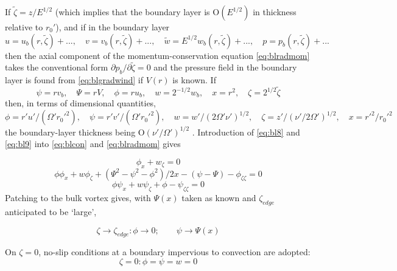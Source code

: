 \documentclass[preprint, prX]{revtex4}
\newcommand{\vpd}[2]{\partial#1 / \partial#2}
\begin{document}
If $\tilde{\zeta} = z/E^{1/2}$ (which implies that the boundary layer is O$(E^{1/2} )$ in thickness relative
to $r_0'$), and if in the boundary layer
\begin{equation}
u = u_b(r,\tilde{\zeta})+..., \quad 
v = v_b(r,\tilde{\zeta})+..., \quad 
\tilde{w} = E^{1/2}w_b(r,\tilde{\zeta})+..., \quad 
p = p_b(r,\tilde{\zeta})+... 
\label{eq:bl8}
\end{equation}
then the axial component of the momentum-conservation equation \eqref{eq:blradmom} takes the conventional form $\vpd{p_b}{\tilde{\zeta}}=0$ and the pressure field in the boundary layer is found from \eqref{eq:blgradwind} if $V(r)$ is known. If
\begin{equation}
\psi = r v_b, \quad
\Psi = rV, \quad
\phi = r u_b, \quad
w=2^{-1/2} w_b, \quad
x=r^2, \quad
\zeta = 2^{1/2} \tilde{\zeta}
\label{eq:bl9}
\end{equation}
then, in terms of dimensional quantities,
\begin{equation}
\phi = r'u'/(\Omega'r_0'^2), \quad
\psi = r'v'/(\Omega'r_0'^2), \quad
w=w'/(2\Omega'\nu')^{1/2}, \quad
\zeta= z'/(\nu'/2\Omega')^{1/2}, \quad
x = r'^2/r_0'^2
\label{eq:bl10}
\end{equation}
the boundary-layer thickness being O$(\nu'/ \Omega')^{1/2}$ . Introduction of \eqref{eq:bl8} and \eqref{eq:bl9} into \eqref{eq:blcon} and \eqref{eq:blradmom} gives

\begin{equation}
\phi_x + w_\zeta =0
\label{eq:bl11}
\end{equation}
\begin{equation}
\phi \phi_x + w \phi_\zeta + (\Psi^2 - \psi^2 - \phi^2)/2x -(\psi - \Psi) - \phi_{\zeta\zeta} = 0
\label{eq:bl12}
\end{equation}
\begin{equation}
\phi \psi_x + w \psi_\zeta + \phi - \psi_{\zeta\zeta}=0
\label{eq:bl13}
\end{equation}
Patching to the bulk vortex gives, with $\Psi(x)$ taken as known and $\zeta_{edge}$ anticipated to be `large',

\begin{equation}
\zeta \rightarrow \zeta_{edge}: \phi \rightarrow 0; \qquad \psi \rightarrow \Psi(x)
\label{eq:bl14}
\end{equation}

On $\zeta =0$, no-slip conditions at a boundary impervious to convection are adopted:
\begin{equation}
\zeta=0:\phi=\psi=w=0
\label{eq:blnonslip}
\end{equation}
\end{document}
